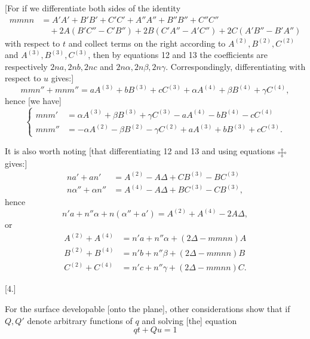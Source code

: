 %
[For if we differentiate both sides of the identity
\[
\begin{aligned}
mmnn&=A'A'+B'B'+C'C'+A''A''+B''B''+C''C''\\
&\quad+2A(B'C''-C'B'')+2B(C'A''-A'C'')+2C(A'B''-B'A'')
\end{aligned}
\]
with respect to $t$ and collect terms on the right according to $A^{(2)},B^{(2)},C^{(2)}$ and $A^{(3)},B^{(3)},C^{(3)}$, then by equations 12 and 13 the coefficients are respectively $2na,2nb,2nc$ and $2n\alpha,2n\beta,2n\gamma$. Correspondingly, differentiating with respect to $u$ gives:]
\[
mmn''+mnm''=aA^{(3)}+bB^{(3)}+cC^{(3)}+\alpha A^{(4)}+\beta B^{(4)}+\gamma C^{(4)},
\]
hence [we have]
\begin{equation}\tag*{$(\odot)$}
\left\{\begin{aligned}
mnm'&=\alpha A^{(3)}+\beta B^{(3)}+\gamma C^{(3)}-aA^{(4)}-bB^{(4)}-cC^{(4)}\\
mnm''&=-\alpha A^{(2)}-\beta B^{(2)}-\gamma C^{(2)}+aA^{(3)}+bB^{(3)}+cC^{(3)}.
\end{aligned}\right.
\end{equation}
\par\indent It is also worth noting [that differentiating 12 and 13 and using equations $\FourRingCross$ gives:]
\[
\begin{aligned}
na'+an'&=A^{(2)}-A\Delta+CB^{(3)}-BC^{(3)}\\
n\alpha''+\alpha n''&=A^{(4)}-A\Delta+BC^{(3)}-CB^{(3)},
\end{aligned}
\]
hence
\[
n'a+n''\alpha+n(\alpha''+a')=A^{(2)}+A^{(4)}-2A\Delta,
\]
or
\[
\begin{aligned}
A^{(2)}+A^{(4)}&=n'a+n''\alpha+(2\Delta-mmnn)A\\
B^{(2)}+B^{(4)}&=n'b+n''\beta+(2\Delta-mmnn)B\\
C^{(2)}+C^{(4)}&=n'c+n''\gamma+(2\Delta-mmnn)C.
\end{aligned}
\]
\begin{center}[4.]\end{center}
\noindent\hspace*{1.2em} For the surface developable [onto the plane], other considerations show that if $Q,Q'$ denote arbitrary functions of $q$ and solving [the] equation
\[
qt+Qu=1
\]

